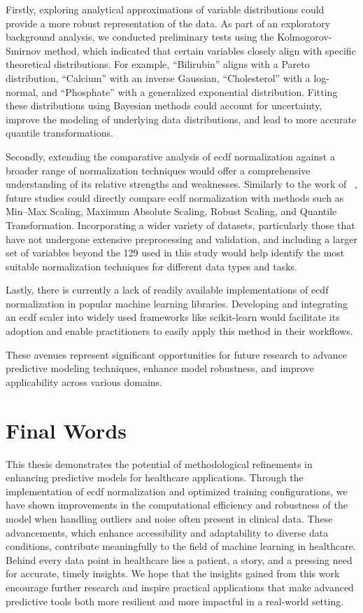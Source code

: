 Firstly, exploring analytical approximations of variable distributions could provide a more robust representation of the data. As part of an exploratory background analysis, we conducted preliminary tests using the Kolmogorov-Smirnov method, which indicated that certain variables closely align with specific theoretical distributions. For example, ``Bilirubin'' aligns with a Pareto distribution, ``Calcium'' with an inverse Gaussian, ``Cholesterol'' with a log-normal, and ``Phosphate'' with a generalized exponential distribution. Fitting these distributions using Bayesian methods could account for uncertainty, improve the modeling of underlying data distributions, and lead to more accurate quantile transformations.

Secondly, extending the comparative analysis of \gls{ecdf} normalization against a broader range of normalization techniques would offer a comprehensive understanding of its relative strengths and weaknesses. Similarly to the work of  \citeauthor{ChoiceScalingTechnique2023}~\cite{ChoiceScalingTechnique2023}, future studies could directly compare \gls{ecdf} normalization with methods such as Min–Max Scaling, Maximum Absolute Scaling, Robust Scaling, and Quantile Transformation. Incorporating a wider variety of datasets, particularly those that have not undergone extensive preprocessing and validation, and including a larger set of variables beyond the 129 used in this study would help identify the most suitable normalization techniques for different data types and tasks.

Lastly, there is currently a lack of readily available implementations of \gls{ecdf} normalization in popular machine learning libraries. Developing and integrating an \gls{ecdf} scaler into widely used frameworks like scikit-learn would facilitate its adoption and enable practitioners to easily apply this method in their workflows.

These avenues represent significant opportunities for future research to advance predictive modeling techniques, enhance model robustness, and improve applicability across various domains.

\section{Final Words}

This thesis demonstrates the potential of methodological refinements in enhancing predictive models for healthcare applications. Through the implementation of \gls{ecdf} normalization and optimized training configurations, we have shown improvements in the computational efficiency and robustness of the model when handling outliers and noise often present in clinical data. These advancements, which enhance accessibility and adaptability to diverse data conditions, contribute meaningfully to the field of machine learning in healthcare.  Behind every data point in healthcare lies a patient, a story, and a pressing need for accurate, timely insights. We hope that the insights gained from this work encourage further research and inspire practical applications that make advanced predictive tools both more resilient and more impactful in a real-world setting.
